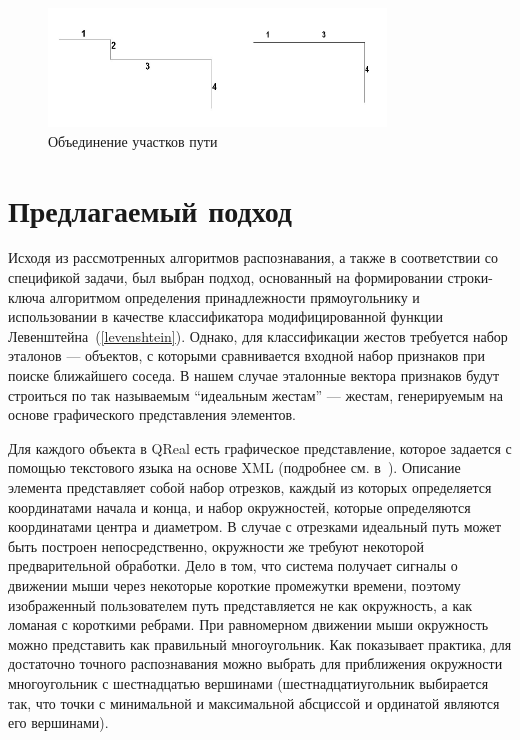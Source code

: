 \documentclass[a5paper]{article}
\begin{document}
\begin{figure} [ht]
  \begin{center}
    \includegraphics[width=0.8\textwidth, bb=0 0 500 200]{04-qt.png}
    \caption{Объединение участков пути}
    \label{qt}
  \end{center}
\end{figure}

\section{Предлагаемый подход}
\label{rectAlgorithm}
Исходя из рассмотренных алгоритмов распознавания, а также в соответствии со спецификой задачи, был выбран подход, основанный на формировании строки-ключа алгоритмом определения принадлежности прямоугольнику и использовании в качестве классификатора модифицированной функции Левенштейна~(\ref{levenshtein}). Однако, для классификации жестов требуется набор эталонов --- объектов, с которыми сравнивается входной набор признаков при поиске ближайшего соседа. В нашем случае эталонные вектора признаков будут строиться по так называемым ``идеальным жестам'' --- жестам, генерируемым на основе графического представления элементов. 

Для каждого объекта в QReal есть графическое представление, которое задается с помощью текстового языка на основе XML (подробнее см. в~\cite{qreal}). Описание элемента представляет собой набор отрезков, каждый из которых определяется координатами начала и конца, и набор окружностей, которые определяются координатами центра и диаметром. В случае с отрезками идеальный путь может быть построен непосредственно, окружности же требуют некоторой предварительной обработки. Дело в том, что система получает сигналы о движении мыши через некоторые короткие промежутки времени, поэтому изображенный пользователем путь представляется не как окружность, а как ломаная с короткими ребрами. При равномерном движении мыши окружность можно представить как правильный многоугольник. Как показывает практика, для достаточно точного распознавания можно выбрать для приближения окружности многоугольник с шестнадцатью вершинами (шестнадцатиугольник выбирается так, что точки с минимальной и максимальной абсциссой и ординатой являются его вершинами). 
\end{document}
